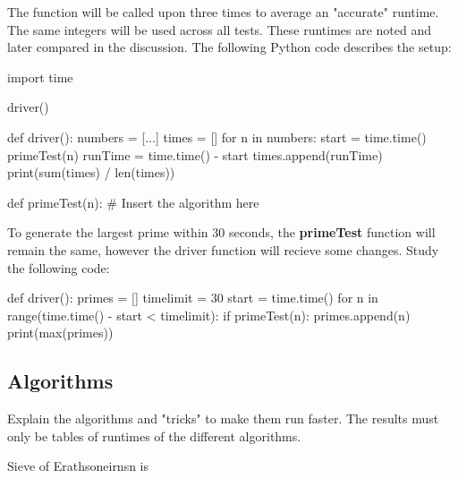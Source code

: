 \documentclass[main.tex]{subfiles}
\begin{document}
\vspace{10mm}

The function will be called upon three times to average an "accurate" runtime. The same integers will be used across all tests. These runtimes are noted and later compared in the discussion. The following Python code describes the setup:

\begin{python}
    import time

    driver()

    def driver():
        numbers = [...]
        times = []
        for n in numbers:
            start = time.time()
            primeTest(n)
            runTime = time.time() - start
            times.append(runTime)
        print(sum(times) / len(times))

    def primeTest(n):
        # Insert the algorithm here
\end{python}

\vspace{10mm}

To generate the largest prime within 30 seconds, the \textbf{primeTest} function will remain the same, however the driver function will recieve some changes. Study the following code:

\begin{python}
    def driver():
        primes = []
        timelimit = 30
        start = time.time()
        for n in range(time.time() - start < timelimit):
            if primeTest(n):
                primes.append(n)
        print(max(primes))
\end{python}

\subsection{Algorithms}
Explain the algorithms and "tricks" to make them run faster. The results must only be tables of runtimes of the different algorithms.

Sieve of Erathsoneirnsn is 
\end{document}
